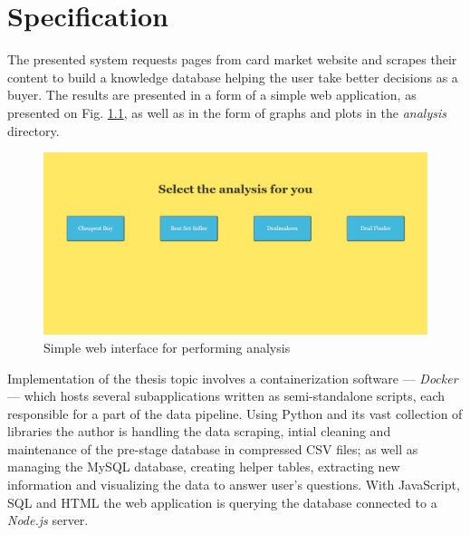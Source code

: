 \chapter{Specification}
\label{ch:specification}
The presented system requests pages from card market website and scrapes their content to build a knowledge database helping the user take better decisions as a buyer. The results are presented in a form of a simple web application, as presented on Fig. \ref{fig:web_app}, as well as in the form of graphs and plots in the \textit{analysis} directory.

\begin{figure}
    \centering
    \includegraphics[width=\textwidth]{figures/web_app.png}
    \caption{Simple web interface for performing analysis}
    \label{fig:web_app}
\end{figure}

Implementation of the thesis topic involves a containerization software --- \textit{Docker} --- which hosts several subapplications written as semi-standalone scripts, each responsible for a part of the data pipeline. Using Python and its vast collection of libraries the author is handling the data scraping, intial cleaning and maintenance of the pre-stage database in compressed CSV files; as well as managing the MySQL database, creating helper tables, extracting new information and visualizing the data to answer user's questions. With JavaScript, SQL and HTML the web application is querying the database connected to a \textit{Node.js} server.



